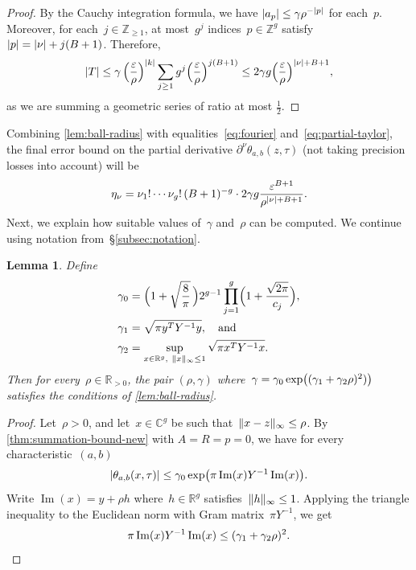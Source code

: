 \documentclass[12pt,oneside]{amsart}
\numberwithin{equation}{section}
\newtheorem{lem}[equation]{Lemma}
\theoremstyle{definition}
\newcommand{\Z}{\mathbb{Z}}
\newcommand{\R}{\mathbb{R}}
\newcommand{\C}{\mathbb{C}}
\newcommand{\eps}{\varepsilon}
\DeclareMathOperator{\im}{Im}
\DeclarePairedDelimiter{\abs}{|}{|}
\DeclarePairedDelimiter{\paren}{(}{)}
\DeclarePairedDelimiter{\norm}{\|}{\|}
\begin{document}
\begin{proof}
  By the Cauchy integration formula, we have
  $\abs{a_p} \leq \gamma \rho^{-\abs{p}}$ for each~$p$. Moreover, for
  each~$j\in \Z_{\geq 1}$, at most~$g^j$ indices~$p\in \Z^g$
  satisfy~$\abs{p} = \abs{\nu} + j(B+1)$.
  Therefore,
  \begin{displaymath}
    \abs{T} \leq \gamma\,\paren[\Big]{\frac{\eps}{\rho}}^{\abs{k}}
    \sum_{j\geq 1} g^j \paren[\Big]{\frac{\eps}{\rho}}^{j(B+1)} \leq 2\gamma g \paren[\Big]{\frac{\eps}{\rho}}^{\abs{\nu} + B+1},
  \end{displaymath}
  as we are summing a geometric series of ratio at most $\tfrac 12$.
\end{proof}

Combining \cref{lem:ball-radius} with equalities~\eqref{eq:fourier}
and~\eqref{eq:partial-taylor}, the final error bound on the partial derivative
$\partial^\nu\theta_{a,b}(z,\tau)$ (not taking precision losses into account)
will be
\begin{equation}
  \label{eq:der-error}
  \eta_\nu = \nu_1!\cdots \nu_g!\, (B+1)^{-g} \cdot 2\gamma g \frac{\eps^{B+1}}{\rho^{\abs{\nu} +
      B + 1}}.
\end{equation}
Next, we explain how suitable values of~$\gamma$ and~$\rho$ can be computed. We
continue using notation from~§\ref{subsec:notation}.

\begin{lem}
  \label{lem:uniform-ubound} Define
  \begin{align*}
    \gamma_0 &= \paren[\Big]{1 + \sqrt{\frac 8\pi}\,} 2^{g-1} \prod_{j=1}^{g}
      \paren[\Big]{1 + \frac{\sqrt{2\pi}}{c_j}},\\
    \gamma_1 &= \sqrt{\pi y^T Y^{-1} y}, \quad\text{and}\\
    \gamma_2 &= \sup_{x\in \R^g,\ \norm{x}_\infty \leq 1} \sqrt{\pi x^T Y^{-1} x}.
  \end{align*}
  Then for every~$\rho\in \R_{>0}$, the pair $(\rho,\gamma)$
  where~$\gamma = \gamma_0\exp\paren[\big]{(\gamma_1 + \gamma_2\rho)^2)}$ satisfies the conditions
  of \cref{lem:ball-radius}.
\end{lem}

\begin{proof}
  Let~$\rho > 0$, and let~$x\in \C^g$ be such
  that~$\norm{x - z}_\infty\leq \rho$. By \cref{thm:summation-bound-new}
  with $A=R=p=0$, we have for every characteristic~$(a,b)$
  \begin{displaymath}
    \abs{\theta_{a,b}(x,\tau)} \leq \gamma_0 \exp \paren[\big]{\pi \im(x) Y^{-1}\im(x)}.
  \end{displaymath}
  Write $\im(x) = y + \rho h$ where~$h\in \R^g$
  satisfies~$\norm{h}_\infty\leq 1$. Applying the triangle inequality to the
  Euclidean norm with Gram matrix~$\pi Y^{-1}$, we get
  \begin{displaymath}
    \pi \im(x) Y^{-1}\im(x) \leq \paren{\gamma_1 + \gamma_2\rho}^2. \qedhere
  \end{displaymath}
\end{proof}
\end{document}
